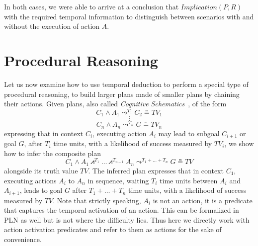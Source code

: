 \documentclass[runningheads]{llncs}
\newcommand{\TImpl}{\textit{Implication}}
\newcommand{\TTV}{\textit{TV}}
\newcommand{\TTVo}{\textit{TV}_1}
\newcommand{\TTVi}{\textit{TV}_i}
\newcommand{\TTVn}{\textit{TV}_n}
\newcommand{\lpreimp}[1]{\leadsto^{#1}}
\newcommand{\lseqand}[1]{\bigslopedwedge^{#1}}
\newcommand{\ldo}[1]{\widehat{#1}}
\begin{document}
\noindent In both cases, we were able to arrive at a conclusion that $\TImpl(P, R)$ with the required temporal information to distinguish between scenarios with and without the execution of action $A$.

\section{Procedural Reasoning}
\label{sec:procedural}
Let us now examine how to use temporal deduction to perform a special
type of procedural reasoning, to build larger plans made of smaller
plans by chaining their actions.  Given plans, also called
\emph{Cognitive Schematics}~\cite{Goertzel2011CSP}, of the form
$$C_1 \land A_1 \lpreimp{T_1} C_2 \measeq \TTVo$$
$$\vdots$$
$$C_n \land A_n \lpreimp{T_n} G \measeq \TTVn$$
expressing that in context $C_i$, executing action $A_i$ may lead to
subgoal $C_{i+1}$ or goal $G$, after $T_i$ time units, with a
likelihood of success measured by $\TTVi$, we show how to infer the
composite plan
$$C_1 \land A_1 \lseqand{T_1} \dots \lseqand{T_{n-1}} A_n
\lpreimp{T_1+\dots+T_n} G \measeq \TTV$$
alongside its truth value $\TTV$.
The inferred plan expresses that in context $C_1$, executing
actions $A_i$ to $A_n$ in sequence, waiting $T_i$ time units between
$A_i$ and $A_{i+1}$, leads to goal $G$ after $T_1+\dots+T_n$ time
units, with a likelihood of success measured by $\TTV$.  Note that
strictly speaking, $A_i$ is not an action, it is a predicate that
captures the temporal activation of an action.  This can be formalized
in PLN as well but is not where the difficulty lies.  Thus here we
directly work with action activation predicates and refer to them as
actions for the sake of convenience.


\end{document}
